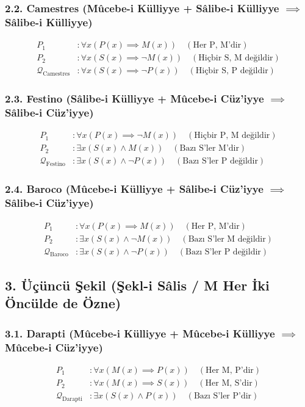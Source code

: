 \documentclass[11pt, a4paper]{article}
\begin{document}
\subsubsection{2.2. Camestres (Mûcebe-i Külliyye + Sâlibe-i Külliyye $\implies$ Sâlibe-i Külliyye)}
\begin{align}
P_1 &: \forall x (P(x) \implies M(x)) \quad (\text{Her P, M'dir}) \\
P_2 &: \forall x (S(x) \implies \neg M(x)) \quad (\text{Hiçbir S, M değildir}) \\
\mathcal{Q}_{\text{Camestres}} &: \forall x (S(x) \implies \neg P(x)) \quad (\text{Hiçbir S, P değildir})
\end{align}

\subsubsection{2.3. Festino (Sâlibe-i Külliyye + Mûcebe-i Cüz'iyye $\implies$ Sâlibe-i Cüz'iyye)}
\begin{align}
P_1 &: \forall x (P(x) \implies \neg M(x)) \quad (\text{Hiçbir P, M değildir}) \\
P_2 &: \exists x (S(x) \land M(x)) \quad (\text{Bazı S'ler M'dir}) \\
\mathcal{Q}_{\text{Festino}} &: \exists x (S(x) \land \neg P(x)) \quad (\text{Bazı S'ler P değildir})
\end{align}

\subsubsection{2.4. Baroco (Mûcebe-i Külliyye + Sâlibe-i Cüz'iyye $\implies$ Sâlibe-i Cüz'iyye)}
\begin{align}
P_1 &: \forall x (P(x) \implies M(x)) \quad (\text{Her P, M'dir}) \\
P_2 &: \exists x (S(x) \land \neg M(x)) \quad (\text{Bazı S'ler M değildir}) \\
\mathcal{Q}_{\text{Baroco}} &: \exists x (S(x) \land \neg P(x)) \quad (\text{Bazı S'ler P değildir})
\end{align}

\subsection{3. Üçüncü Şekil (Şekl-i Sâlis / M Her İki Öncülde de Özne)}

\subsubsection{3.1. Darapti (Mûcebe-i Külliyye + Mûcebe-i Külliyye $\implies$ Mûcebe-i Cüz'iyye)}
\begin{align}
P_1 &: \forall x (M(x) \implies P(x)) \quad (\text{Her M, P'dir}) \\
P_2 &: \forall x (M(x) \implies S(x)) \quad (\text{Her M, S'dir}) \\
\mathcal{Q}_{\text{Darapti}} &: \exists x (S(x) \land P(x)) \quad (\text{Bazı S'ler P'dir})
\end{align}
\end{document}
